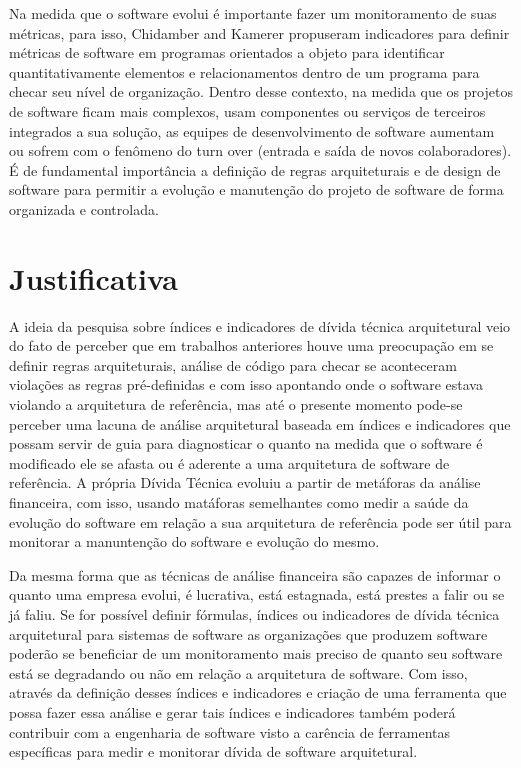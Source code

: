 \documentclass[
	12pt,				%
	openright,			%
	twoside,			%
	a4paper,			%
	english,			%
	french,				%
	spanish,			%
	brazil,				%
	]{abntex2}
\begin{document}
Na medida que o software evolui é importante fazer um monitoramento
de suas métricas, para isso, Chidamber and Kamerer propuseram indicadores
para definir métricas de software em programas orientados a objeto
para identificar quantitativamente elementos e relacionamentos dentro
de um programa para checar seu nível de organização. 
Dentro desse contexto, na medida que os projetos de software ficam
mais complexos, usam componentes ou serviços de terceiros integrados
a sua solução, as equipes de desenvolvimento de software aumentam
ou sofrem com o fenômeno do turn over (entrada e saída de novos colaboradores).
É de fundamental importância a definição de regras arquiteturais e
de design de software para permitir a evolução e manutenção do projeto
de software de forma organizada e controlada. 

\chapter{Justificativa}


A ideia da pesquisa sobre índices e indicadores de dívida técnica
arquitetural veio do fato de perceber que em trabalhos anteriores
houve uma preocupação em se definir regras arquiteturais, análise
de código para checar se aconteceram violações as regras pré-definidas
e com isso apontando onde o software estava violando a arquitetura
de referência, mas até o presente momento pode-se perceber uma lacuna
de análise arquitetural baseada em índices e indicadores que possam
servir de guia para diagnosticar o quanto na medida que o software
é modificado ele se afasta ou é aderente a uma arquitetura de software
de referência. A própria Dívida Técnica evoluiu a partir de metáforas
da análise financeira, com isso, usando matáforas semelhantes como
medir a saúde da evolução do software em relação a sua arquitetura
de referência pode ser útil para monitorar a manuntenção do software
e evolução do mesmo.

Da mesma forma que as técnicas de análise financeira são capazes de
informar o quanto uma empresa evolui, é lucrativa, está estagnada,
está prestes a falir ou se já faliu. Se for possível definir fórmulas,
índices ou indicadores de dívida técnica arquitetural para sistemas
de software as organizações que produzem software poderão se beneficiar
de um monitoramento mais preciso de quanto seu software está se degradando
ou não em relação a arquitetura de software. Com isso, através da
definição desses índices e indicadores e criação de uma ferramenta
que possa fazer essa análise e gerar tais índices e indicadores também
poderá contribuir com a engenharia de software visto a carência de
ferramentas específicas para medir e monitorar dívida de software
arquitetural. 
\end{document}

